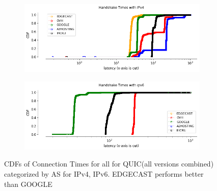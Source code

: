 \begin{frame}
\begin{figure}[!htb]
    
    \begin{subfigure}{0.45\textwidth}
        \includegraphics[width=\linewidth]{./plots/VM/handshake_times_IPv4_asno.png}
    \end{subfigure}
    \begin{subfigure}{0.45\textwidth}
        \includegraphics[width=\linewidth]{./plots/VM/handshake_times_ipv6_asno.png}
    \end{subfigure} 
    \caption{CDFs of Connection Times for all for QUIC(all versions combined) categorized by AS for IPv4, IPv6. EDGECAST performs better than GOOGLE}\label{fig:connection-times-for}
\end{figure}


\begin{figure}[!htb]
    

\end{figure}
\end{frame}
